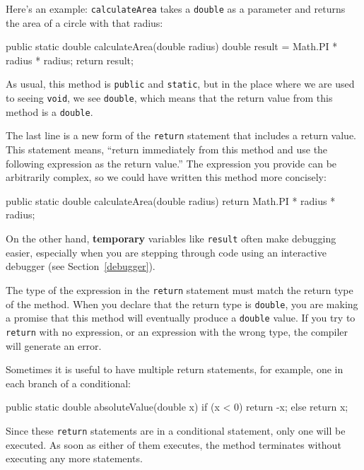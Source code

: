 \documentclass[12pt]{book}
\theoremstyle{exercise}
\newcommand{\java}[1]{\verb"#1"}
\begin{document}
Here's an example:  \java{calculateArea} takes a \java{double} as a parameter and returns the area of a circle with that radius:

\begin{code}
    public static double calculateArea(double radius) {
        double result = Math.PI * radius * radius;
        return result;
    }
\end{code}

As usual, this method is \java{public} and \java{static}, but in the place where we are used to seeing \java{void}, we see \java{double}, which means that the return value from this method is a \java{double}.


The last line is a new form of the \java{return} statement that includes a return value.
This statement means, ``return immediately from this method and use the following expression as the return value.''
The expression you provide can be arbitrarily complex, so we could have written this method more concisely:

\begin{code}
    public static double calculateArea(double radius) {
        return Math.PI * radius * radius;
    }
\end{code}


On the other hand, {\bf temporary} variables like \java{result} often make debugging easier, especially when you are stepping through code using an interactive debugger (see Section~\ref{debugger}).

The type of the expression in the \java{return} statement must match the return type of the method.
When you declare that the return type is \java{double}, you are making a promise that this method will eventually produce a \java{double} value.
If you try to \java{return} with no expression, or an expression with the wrong type, the compiler will generate an error.

Sometimes it is useful to have multiple return statements, for example, one in each branch of a conditional:

\begin{code}
    public static double absoluteValue(double x) {
        if (x < 0) {
            return -x;
        } else {
            return x;
        }
    }
\end{code}

Since these \java{return} statements are in a conditional statement, only one will be executed.
As soon as either of them executes, the method terminates without executing any more statements.
\end{document}
